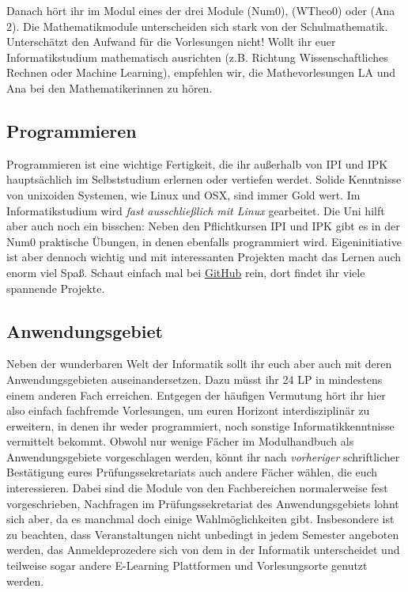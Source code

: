 Danach hört ihr im Modul  eines der drei Module  (\gls{Num0}),  (\gls{WTheo0}) oder  (\gls{Ana} 2). Die Mathematikmodule unterscheiden sich stark von der Schulmathematik. Unterschätzt den Aufwand für die Vorlesungen nicht! Wollt ihr euer Informatikstudium mathematisch ausrichten (z.B. Richtung Wissenschaftliches Rechnen oder Machine Learning), empfehlen wir, die Mathevorlesungen \gls{LA} und \gls{Ana} bei den Mathematikerinnen zu hören.

\subsection{Programmieren}

Programmieren ist eine wichtige Fertigkeit, die ihr außerhalb von \gls{IPI} und \gls{IPK} hauptsächlich im Selbststudium erlernen oder vertiefen werdet. Solide Kenntnisse von unixoiden Systemen, wie Linux und OSX, sind immer Gold wert. Im Informatikstudium wird \emph{fast ausschließlich mit Linux} gearbeitet. Die Uni hilft aber auch noch ein bisschen: Neben den Pflichtkursen \gls{IPI} und \gls{IPK} gibt es in der \gls{Num0} praktische Übungen, in denen ebenfalls programmiert wird. Eigeninitiative ist aber dennoch wichtig und mit interessanten Projekten macht das Lernen auch enorm viel Spaß. Schaut einfach mal bei \href{https://github.com}{GitHub} rein, dort findet ihr viele spannende Projekte.

\subsection{Anwendungsgebiet}

Neben der wunderbaren Welt der Informatik sollt ihr euch aber auch mit deren Anwendungsgebieten auseinandersetzen. Dazu müsst ihr 24 \gls{LP} in mindestens einem anderen Fach erreichen. Entgegen der häufigen Vermutung hört ihr hier also einfach fachfremde Vorlesungen, um euren Horizont interdisziplinär zu erweitern, in denen ihr weder programmiert, noch sonstige Informatikkenntnisse vermittelt bekommt. Obwohl nur wenige Fächer im Modulhandbuch als Anwendungsgebiete vorgeschlagen werden, könnt ihr nach \emph{vorheriger} schriftlicher Bestätigung eures Prüfungssekretariats auch andere Fächer wählen, die euch interessieren. Dabei sind die Module von den Fachbereichen normalerweise fest vorgeschrieben, Nachfragen im Prüfungssekretariat des Anwendungsgebiets lohnt sich aber, da es manchmal doch einige Wahlmöglichkeiten gibt. Insbesondere ist zu beachten, dass Veranstaltungen nicht unbedingt in jedem Semester angeboten werden, das Anmeldeprozedere sich von dem in der Informatik unterscheidet und teilweise sogar andere E-Learning Plattformen und Vorlesungsorte genutzt werden.

